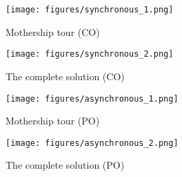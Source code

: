 \begin{figure}[h!]
\centering
\texttt{[image: figures/synchronous\_1.png]}
\caption{Mothership tour (CO) \label{fig:Mtour_CO}}
\end{figure}
\begin{figure}[h!]
\centering
\texttt{[image: figures/synchronous\_2.png]}
\caption{The complete solution (CO) \label{fig:tourD_CO}}
\end{figure}

\begin{figure}[h!]
\centering
\texttt{[image: figures/asynchronous\_1.png]}
\caption{Mothership tour (PO) \label{fig:Mtour_PO}}
\end{figure}
\begin{figure}[h!]
\centering
\texttt{[image: figures/asynchronous\_2.png]}
\caption{The complete solution (PO) \label{fig:tourD_PO}}
\end{figure}